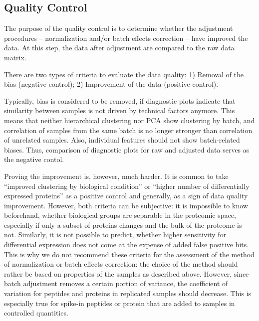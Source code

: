\documentclass[num-refs]{wiley-article}
\begin{document}
\subsection{Quality Control}

The purpose of the quality control is to determine whether the adjustment procedures – normalization and/or batch effects correction – have improved the data. At this step, the data after adjustment are compared to the raw data matrix.

There are two types of criteria to evaluate the data quality: 1) Removal of the bias (negative control); 2) Improvement of the data (positive control).

Typically, bias is considered to be removed, if diagnostic plots indicate that similarity between samples is not driven by technical factors anymore. This means that neither hierarchical clustering nor PCA show clustering by batch, and correlation of samples from the same batch is no longer stronger than correlation of unrelated samples. Also, individual features should not show batch-related biases. Thus, comparison of diagnostic plots for raw and adjusted data serves as the negative contol.

Proving the improvement is, however, much harder. It is common to take “improved clustering by biological condition” or “higher number of differentially expressed proteins” as a positive control and generally, as a sign of data quality improvement. However, both criteria can be subjective: it is impossible to know beforehand, whether biological groups are separable in the proteomic space, especially if only a subset of proteins changes and the bulk of the proteome is not. Similarly, it is not possible to predict, whether higher sensitivity for differential expression does not come at the expense of added false positive hits. This is why we do not recommend these criteria for the assessment of the method of normalization or batch effects correction: the choice of the method should rather be based on properties of the samples as described above. However, since batch adjustment removes a certain portion of variance, the coefficient of variation for peptides and proteins in replicated samples should decrease. This is especially true for spike-in peptides or protein that are added to samples in controlled quantities. 
\end{document}
